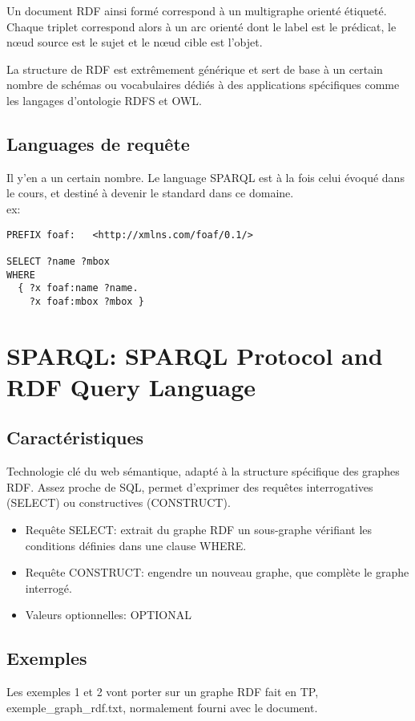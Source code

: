 \documentclass[11pt,a4paper]{article}
\begin{document}
Un document RDF ainsi formé correspond à un multigraphe orienté étiqueté. Chaque triplet correspond alors à un arc orienté dont le label est le prédicat, le nœud source est le sujet et le nœud cible est l'objet.

La structure de RDF est extrêmement générique et sert de base à un certain nombre de schémas ou vocabulaires dédiés à des applications spécifiques comme les langages d'ontologie RDFS et OWL.

\subsection{Languages de requête}
Il y'en a un certain nombre. Le language SPARQL est à la fois celui évoqué dans le cours, et destiné à devenir le standard dans ce domaine.\\
ex:
\begin{lstlisting}
PREFIX foaf:   <http://xmlns.com/foaf/0.1/>

SELECT ?name ?mbox
WHERE
  { ?x foaf:name ?name.
    ?x foaf:mbox ?mbox }
\end{lstlisting}

\section{SPARQL: SPARQL Protocol and RDF Query Language}
\subsection{Caractéristiques}
Technologie clé du web sémantique, adapté à la structure spécifique des graphes RDF. Assez proche de SQL, permet d'exprimer des requêtes interrogatives (SELECT) ou constructives (CONSTRUCT).
\begin{itemize}
    \item Requête SELECT: extrait du graphe RDF un sous-graphe vérifiant les conditions définies dans une clause WHERE.
    \item Requête CONSTRUCT: engendre un nouveau graphe, que complète le graphe interrogé.
    \item Valeurs optionnelles: OPTIONAL
\end{itemize}

\subsection{Exemples}
Les exemples 1 et 2 vont porter sur un graphe RDF fait en TP, exemple\_graph\_rdf.txt, normalement fourni avec le document.
\end{document}
